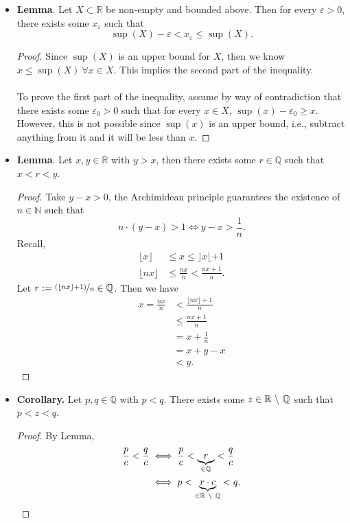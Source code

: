 \documentclass{article}
\newcommand{\Q}{\mathbb{Q}}
\newcommand{\R}{\mathbb{R}}
\newcommand{\N}{\mathbb{N}}
\newcommand{\?}{\stackrel{?}{=}}
\begin{document}
\begin{itemize}
\begin{proof}
    \end{proof}
    \item \textbf{Lemma}. Let $X \subset \R$ be non-empty and bounded above. Then for every $\varepsilon > 0$, there exists some $x_\varepsilon$ such that
    $$\sup(X) - \varepsilon < x_\varepsilon \leq \sup(X).$$
    \begin{proof}
        Since $\sup(X)$ is an upper bound for $X$, then we know $x \leq \sup(X) \ \forall x \in X$. This implies the second part of the inequality. \\\\
        To prove the first part of the inequality, assume by way of contradiction that there exists some $\varepsilon_0 > 0$ such that for every $x \in X$, $\sup(x) - \varepsilon_0 \geq x$. However, this is not possible since $\sup(x)$ is an upper bound, i.e., subtract anything from it and it will be less than $x$.
    \end{proof}
    \item \textbf{Lemma}. Let $x, y \in \R$ with $y > x$, then there exists some $r \in \Q$ such that $x < r < y$.
    \begin{proof}
        Take $y - x > 0$, the Archimidean principle guarantees the existence of $n \in \N$ such that
        $$n \cdot (y - x) > 1 \iff y - x > \frac{1}{n}.$$
        Recall,
        \begin{align*}
            \lfloor x \rfloor &\leq x \leq \rfloor x \lfloor + 1 \\
            \lfloor nx \rfloor &\leq \frac{nx}{n} < \frac{nx + 1}{n}.
        \end{align*}
        Let $r := \nicefrac{(\lfloor nx \rfloor + 1)}{n} \in \Q$. Then we have
        \begin{align*}
            x = \frac{nx}{n} &< \frac{\lfloor nx \rfloor + 1}{n} \\
            &\leq \frac{nx + 1}{n} \\
            &= x + \frac{1}{n} \\
            &= x + y - x \\
            &< y.
        \end{align*}
    \end{proof}
    \item \textbf{Corollary.} Let $p, q \in \Q$ with $p < q$. There exists some $z \in \R \ \symbol{92} \ \Q$ such that $p < z < q$.
    \begin{proof}
        By Lemma,
        \begin{align*}
            \frac{p}{c} < \frac{q}{c} &\iff \frac{p}{c} < \underbrace{r}_{\in \Q} < \frac{q}{c} \\
            &\iff p < \underbrace{r \cdot c}_{\in \R \ \symbol{92} \ \Q} < q.
        \end{align*}
    \end{proof}
\end{itemize}
\end{document}
